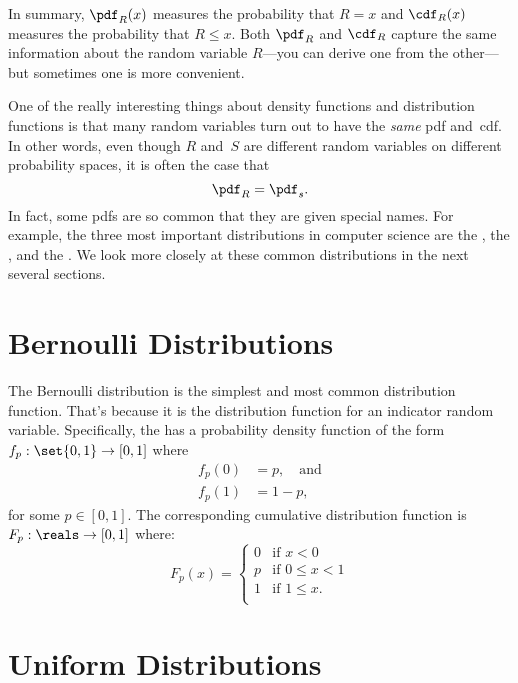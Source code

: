 In summary, $\pdf_R(x)$ measures the probability that $R = x$ and
$\cdf_R(x)$ measures the probability that $R \leq x$.  Both $\pdf_R$
and $\cdf_R$ capture the same information about the random variable
$R$---you can derive one from the other---but sometimes one is more
convenient.

One of the really interesting things about density functions and
distribution functions is that many random variables turn out to have
the \emph{same} pdf and~cdf.  In other words, even though $R$ and~$S$
are different random variables on different probability spaces, it is
often the case that
\begin{equation*}
    \pdf_R = \pdf_s.
\end{equation*}
In fact, some pdfs are so common that they are given special names.
For example, the three most important distributions in computer
science are the , the , and the .  We look more
closely at these common distributions in the next several sections.

\section{Bernoulli Distributions}\label{sec:bernoulli_dist}

The Bernoulli distribution is the simplest and most common
distribution function.  That's because it is the distribution function
for an indicator random variable.  Specifically, the  has a probability density function of the form $f_p:
\set{0, 1} \to [0, 1]$ where
\begin{align*}
    f_p(0) &= p, \quad\text{and} \\
    f_p(1) &= 1 - p,
\end{align*}
for some $p \in [0, 1]$.  The corresponding cumulative distribution
function is $F_p: \reals \to [0, 1]$ where:
\begin{equation*}
F_{p}(x) =
    \begin{cases}
        0 & \text{if $x < 0$} \\
        p & \text{if $0 \le x < 1$} \\
        1 & \text{if $1 \le x$}. \\
    \end{cases}
\end{equation*}

\section{Uniform Distributions}\label{sec:uniform_dist}

